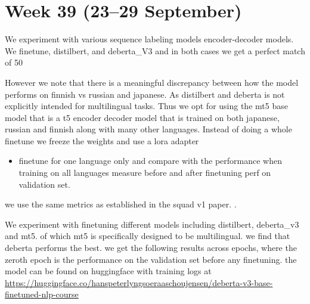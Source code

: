 \documentclass[11pt]{article}
\begin{document}
\section{Week 39 (23--29 September)}

We experiment with various sequence labeling models encoder-decoder models. 
We finetune, distilbert, and deberta\_V3 and in both cases we get a perfect match of 50%

However we note that there is a meaningful discrepancy between how the model performs on finnish vs russian and japanese. As distilbert and deberta is not explicitly intended for multilingual tasks.
Thus we opt for using the mt5 base model that is a t5 encoder decoder model that is trained on both japanese, russian and finnish along with many other languages.
Instead of doing a whole finetune we freeze the weights and use a lora adapter 


\begin{itemize}
    \item 
    finetune for one language only and compare with the performance when training on all languages
    measure before and after finetuning perf on validation set.
\end{itemize}

we use the same metrics as established in the squad v1 paper. \cite{rajpurkar-etal-2018-know}.

We experiment with finetuning different models including distilbert, deberta\_v3 and mt5. of which mt5 is specifically designed to be multilingual.
we find that deberta performs the best.
we get the following results across epochs, where the zeroth epoch is the performance on the validation set before any finetuning.
the model can be found on huggingface with training logs at \url{https://huggingface.co/hanspeterlyngsoeraaschoujensen/deberta-v3-base-finetuned-nlp-course}
\end{document}
